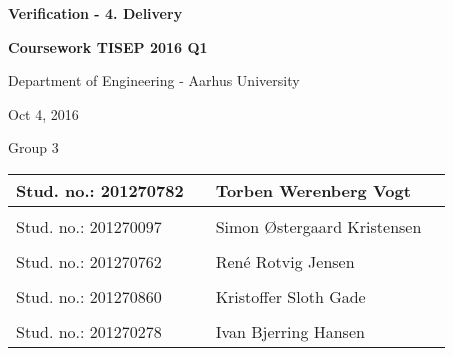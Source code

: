 
\centerline{\Huge\bfseries\color{ThemeColor}Verification  - 4. Delivery}

\vspace{1em}
\centerline{\Large\bfseries\color{BlackColor} Coursework TISEP 2016 Q1}



\vspace{5em}
\centerline{\large\bfseries\color{BlackColor}}
\centerline{\large\color{BlackColor}Department of Engineering - Aarhus University}

\vspace{0.5em}
\centerline{\large\color{BlackColor} Oct 4, 2016}

\vspace{0.5em}
\centerline{\large\color{BlackColor} Group 3}

\vspace{25em}

\begin{center}
   \begin{tabular}{ l p{3cm} l l }
   Stud. no.: 201270782 && Torben Werenberg Vogt & \\\hline
   & & \\
   Stud. no.: 201270097 && Simon Østergaard Kristensen & \\\hline
   & & \\
   Stud. no.: 201270762 && René Rotvig Jensen & \\\hline
   & & \\
   Stud. no.: 201270860 && Kristoffer Sloth Gade & \\\hline
   & & \\
   Stud. no.: 201270278 &&  Ivan Bjerring Hansen & \\\hline
   \end{tabular}
\end{center}
\thispagestyle{empty} %
\restoregeometry

